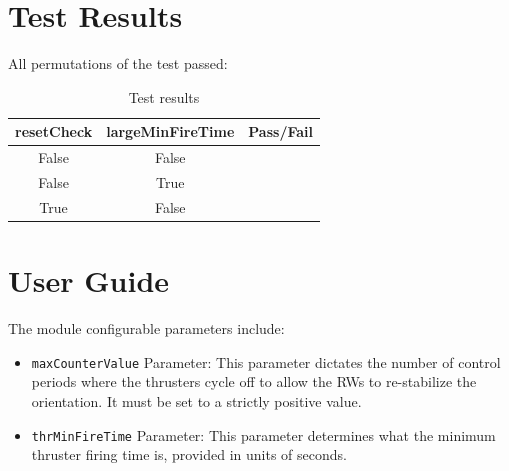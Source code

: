 \documentclass[]{BasiliskReportMemo}
\begin{document}
\section{Test Results}
All permutations of the test passed:
\begin{table}[h]
	\caption{Test results}
	\label{tab:results}
	\centering \fontsize{10}{10}\selectfont
	\begin{tabular}{c | c | c  } %
		\hline\hline
		\textbf{resetCheck} & \textbf{largeMinFireTime}	&\textbf{Pass/Fail} \\ 
		\hline
	   False & 	  False 			&  \\ 
	   False & True	   			&  \\ 
	   True & False 	   			&  \\ 
	   \hline\hline
	\end{tabular}
\end{table}









\section{User Guide}
The module configurable parameters include:
\begin{itemize}
	\item {{\tt maxCounterValue} Parameter}: 
This parameter dictates the number of control periods where the thrusters cycle off to allow the RWs to re-stabilize the orientation.  It must be set to a strictly positive value.  

	\item {{\tt thrMinFireTime} Parameter}: 
This parameter determines what the minimum thruster firing time is, provided in units of seconds.  
\end{itemize}
\end{document}
